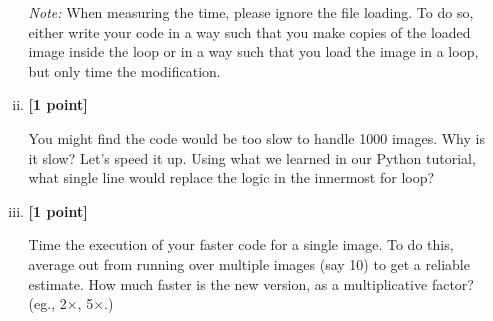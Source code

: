 \documentclass[11pt]{article}
\begin{document}
\begin{enumerate}[(a)]
\begin{enumerate}[(i)]
\emph{Note: } When measuring the time, please ignore the file loading. To do so, either write your code in a way such that you make copies of the loaded image inside the loop or in a way such that you load the image in a loop, but only time the modification.


\item \textbf{[1 point]}
\begin{tcolorbox}[colback=orange!5!white,colframe=orange!75!black]
 You might find the code would be too slow to handle 1000 images. Why is it slow? Let's speed it up. Using what we learned in our Python tutorial, what single line would replace the logic in the innermost for loop?
\end{tcolorbox}


\item \textbf{[1 point]}
\begin{tcolorbox}[colback=orange!5!white,colframe=orange!75!black]
Time the execution of your faster code for a single image. To do this, average out from running over multiple images (say 10) to get a reliable estimate. How much faster is the new version, as a multiplicative factor? (eg., 2$\times$, 5$\times$.)
\end{tcolorbox}


\end{enumerate}
\end{enumerate}
\end{document}
